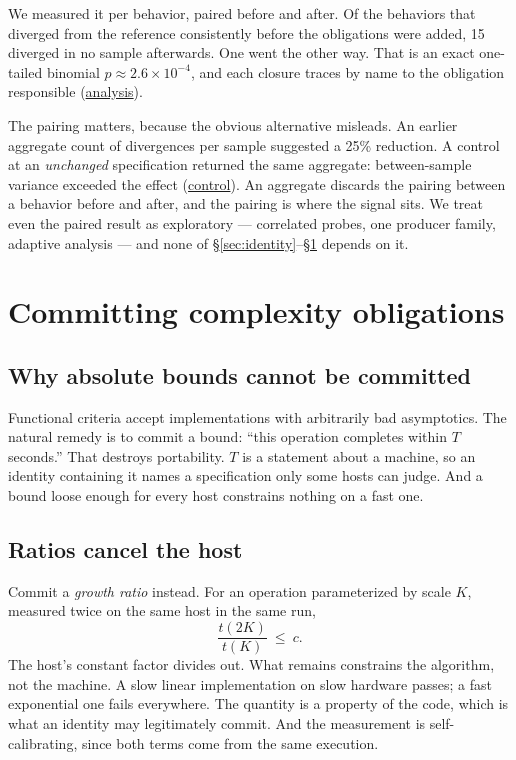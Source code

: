 \documentclass[10pt,twocolumn,letterpaper]{article}
\newcommand{\art}[2]{\href{https://github.com/rz4/reticuli/blob/5318acaac34ef99eeba9ff064a995a6313cc70ec/#1}{#2}}
\begin{document}
We measured it per behavior, paired before and after. Of the behaviors that diverged from the reference consistently before the obligations were added, 15 diverged in no sample afterwards. One went the other way. That is an exact one-tailed binomial $p\approx2.6\times10^{-4}$, and each closure traces by name to the obligation responsible (\art{research/external/jq/rate-metric-findings.md}{analysis}).

The pairing matters, because the obvious alternative misleads. An earlier aggregate count of divergences per sample suggested a 25\% reduction. A control at an \emph{unchanged} specification returned the same aggregate: between-sample variance exceeded the effect (\art{research/external/jq/generation-4-control-CORRECTION.md}{control}). An aggregate discards the pairing between a behavior before and after, and the pairing is where the signal sits. We treat even the paired result as exploratory --- correlated probes, one producer family, adaptive analysis --- and none of §\ref{sec:identity}--§\ref{sec:resource} depends on it.

\section{Committing complexity obligations}
\label{sec:resource}
\subsection{Why absolute bounds cannot be committed}
Functional criteria accept implementations with arbitrarily bad asymptotics. The natural remedy is to commit a bound: ``this operation completes within $T$ seconds.'' That destroys portability. $T$ is a statement about a machine, so an identity containing it names a specification only some hosts can judge. And a bound loose enough for every host constrains nothing on a fast one.

\subsection{Ratios cancel the host}
Commit a \emph{growth ratio} instead. For an operation parameterized by scale $K$, measured twice on the same host in the same run,
\begin{equation}
\frac{t(2K)}{t(K)}\ \le\ c.
\label{eq:ratio}
\end{equation}
The host's constant factor divides out. What remains constrains the algorithm, not the machine. A slow linear implementation on slow hardware passes; a fast exponential one fails everywhere. The quantity is a property of the code, which is what an identity may legitimately commit. And the measurement is self-calibrating, since both terms come from the same execution.
\end{document}
